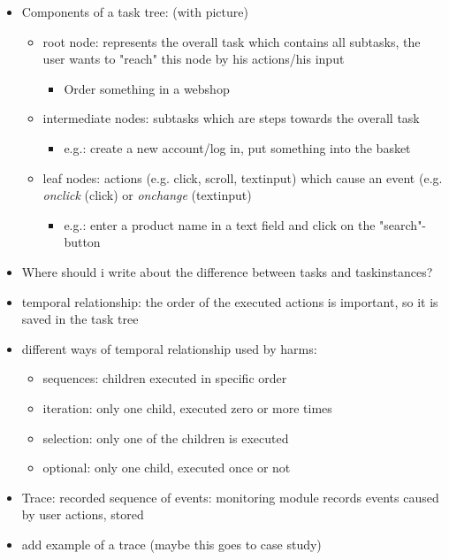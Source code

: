 \begin{itemize} 
	
	\item Components of a task tree: (with picture)
	\begin{itemize}
		\item root node: represents the overall task which contains all subtasks, the user wants to "reach" this node by his actions/his input
		\begin{itemize}
    			\item Order something in a webshop
		\end{itemize}
		\item intermediate nodes: subtasks which are steps towards the overall task
		\begin{itemize}
			\item e.g.: create a new account/log in, put something into the basket
		\end{itemize}
		\item leaf nodes: actions (e.g. click, scroll, textinput) which cause an event (e.g. \textit{onclick} (click) or \textit{onchange} (textinput)
		\begin{itemize}
			\item e.g.: enter a product name in a text field and click on the "search"-button
		\end{itemize}
	\end{itemize}
	\item Where should i write about the difference between tasks and taskinstances? 	
	\item temporal relationship: the order of the executed actions is important, so it is saved in the task tree
	\item different ways of temporal relationship used by harms: 
	\begin{itemize}
		\item sequences: children executed in specific order
		\item iteration: only one child, executed zero or more times
		\item selection: only one of the children is executed
		\item optional:  only one child, executed once or not
	\end{itemize}	
	\item Trace: recorded sequence of events: monitoring module records events caused by user actions, stored 
	\item add example of a trace (maybe this goes to case study)
\end{itemize}

